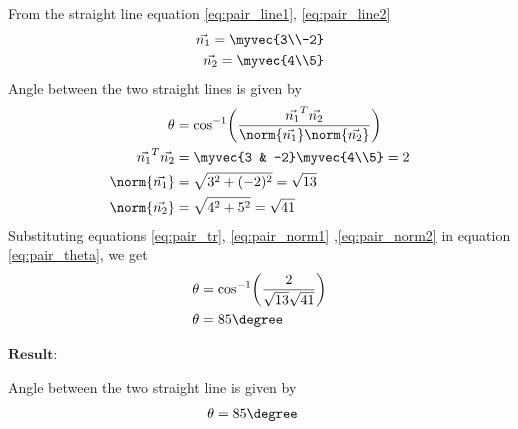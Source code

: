 \begin{enumerate}[label=\thesection.\arabic*.,ref=\thesection.\theenumi]
From the straight line equation \eqref{eq:pair_line1}, \eqref{eq:pair_line2} 
\begin{align}
    \vec{n_1}=\myvec{3\\-2}\\
    \vec{n_2}=\myvec{4\\5}
\end{align}
Angle between the two straight lines is given by 
\begin{align}
    \theta&=\cos^{-1}\biggl(\frac{\vec{n_1}^T\vec{n_2}}{\norm{\vec{n_1}}\norm{\vec{n_2}}}\biggr)\label{eq:pair_t}
\\
    \vec{n_1}^T\vec{n_2}&=\myvec{3 & -2}\myvec{4\\5}=2\label{eq:pair_tr}\\
    \norm{\vec{n_1}}&=\sqrt{3^2+(-2)^2}=\sqrt{13}\label{eq:pair_norm1}\\
    \norm{\vec{n_2}}&=\sqrt{4^2+5^2}=\sqrt{41}\label{eq:pair_norm2}
\end{align}
Substituting equations \eqref{eq:pair_tr}, \eqref{eq:pair_norm1} ,\eqref{eq:pair_norm2} in equation \eqref{eq:pair_theta}, we get 
\begin{align}
        \theta&=\cos^{-1}\biggl(\frac{2}{\sqrt{13}\sqrt{41}}\biggr)\\
        \theta&=85\degree
\end{align}

$\boldsymbol{ Result : }$

Angle between the two straight line is given by
\begin{align}
    \theta&=85\degree
\end{align}


\end{enumerate}

